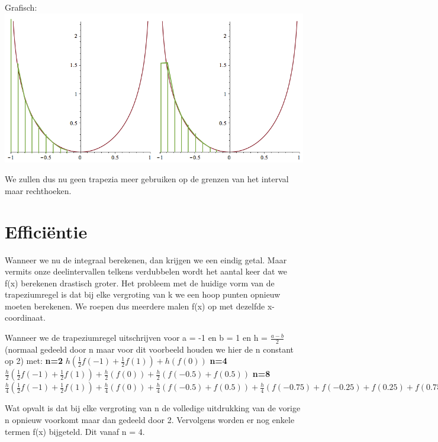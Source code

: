 \documentclass{article}
\begin{document}
\begin{flushleft}
Grafisch:
\newline
\includegraphics[scale=1.5]{Plot2}
\newline

We zullen dus nu geen trapezia meer gebruiken op de grenzen van het interval maar rechthoeken.

\section{Efficiëntie}
Wanneer we nu de integraal berekenen, dan krijgen we een eindig getal. Maar vermits onze deelintervallen telkens verdubbelen wordt het aantal keer dat we f(x) berekenen drastisch groter. Het probleem met de huidige vorm van de trapeziumregel is dat bij elke vergroting van k we een hoop punten opnieuw moeten berekenen. We roepen dus meerdere malen f(x) op met dezelfde x-coordinaat.
\newline

Wanneer we de trapeziumregel uitschrijven voor a = -1 en b = 1 en h = $\frac{a-b}{2}$(normaal gedeeld door n maar voor dit voorbeeld houden we hier de n constant op 2) met:
\newline
\textbf{n=2} 
\newline
$h(\frac{1}{2}f(-1)+\frac{1}{2}f(1)) + h(f(0))$
\newline
\textbf{n=4} 
\newline
$\frac{h}{2}(\frac{1}{2}f(-1)+\frac{1}{2}f(1)) + \frac{h}{2}(f(0)) + \frac{h}{2}(f(-0.5) + f(0.5))$
\newline
\textbf{n=8} 
\newline
$\frac{h}{4}(\frac{1}{2}f(-1)+\frac{1}{2}f(1)) + \frac{h}{4}(f(0)) + \frac{h}{4}(f(-0.5) + f(0.5)) + \frac{h}{4}(f(-0.75) + f(-0.25)+f(0.25) + f(0.75))$
\newline

Wat opvalt is dat bij elke vergroting van n de volledige uitdrukking van de vorige n opnieuw voorkomt maar dan gedeeld door 2. Vervolgens worden er nog enkele termen f(x) bijgeteld. Dit vanaf n = 4.
\newline


\end{flushleft}
\end{document}
